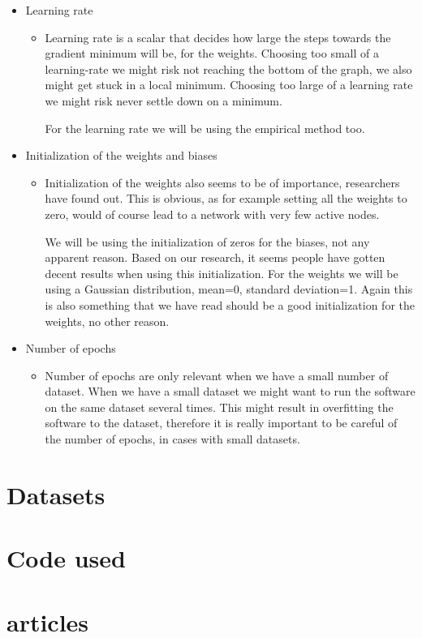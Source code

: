 \documentclass[Report.tex]{subfiles}
\begin{document}
\begin{flushleft}
\begin{itemize}
\begin{itemize}
     \end{itemize}
     \item{Learning rate}
     \begin{itemize}
      \item{Learning rate is a scalar that decides how large the steps towards the gradient minimum will be, for the weights. Choosing too small of a learning-rate we might risk not reaching the bottom of the graph, we also might get stuck in a local minimum. Choosing too large of a learning rate we might risk never settle down on a minimum. \par
      For the learning rate we will be using the empirical method too.}
     \end{itemize}
     \item{Initialization of the weights and biases}
     \begin{itemize}
      \item{Initialization of the weights also seems to be of importance, researchers have found out. This is obvious, as for example setting all the weights to zero, would of course lead to a network with very few active nodes. \par
      We will be using the initialization of zeros for the biases, not any apparent reason. Based on our research, it seems people have gotten decent results when using this initialization. For the weights we will be using a Gaussian distribution, mean=0, standard deviation=1. Again this is also something that we have read should be a good initialization for the weights, no other reason.}
     \end{itemize}
     \item{Number of epochs}
     \begin{itemize}
      \item{Number of epochs are only relevant when we have a small number of dataset. When we have a small dataset we might want to run the software on the same dataset several times. This might result in overfitting the software to the dataset, therefore it is really important to be careful of the number of epochs, in cases with small datasets.}
     \end{itemize}
    \end{itemize}
  \end{flushleft}
  

\section{Datasets}
\section{Code used}
\section{articles}

\end{document}
